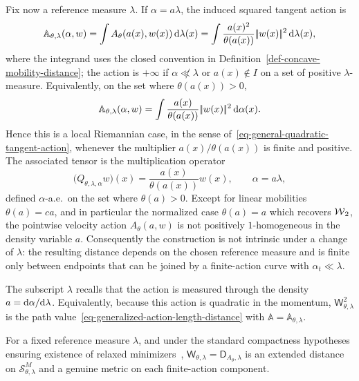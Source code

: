 Fix now a reference measure \(\lambda\). If \(\alpha=a\lambda\), the induced squared tangent action is
\[
	\mathbb A_{\theta,\lambda}(\alpha,w)
	=
	\int A_\theta(a(x),w(x))\,\mathrm{d}\lambda(x)
	=
	\int \frac{a(x)^2}{\theta(a(x))}|\!| w(x) |\!|^2\,\mathrm{d}\lambda(x),
\]
where the integrand uses the closed convention in Definition~\ref{def-concave-mobility-distance}; the action is $+\infty$ if $\alpha\not\ll\lambda$ or $a(x)\notin I$ on a set of positive $\lambda$-measure. Equivalently, on the set where \(\theta(a(x))>0\),
\[
	\mathbb A_{\theta,\lambda}(\alpha,w)
	=
	\int \frac{a(x)}{\theta(a(x))}|\!| w(x) |\!|^2\,\mathrm{d}\alpha(x).
\]
Hence this is a local Riemannian case, in the sense of~\eqref{eq-general-quadratic-tangent-action}, whenever the multiplier \(a(x)/\theta(a(x))\) is finite and positive. The associated tensor is the multiplication operator
\begin{equation}\label{eq-concave-mobility-q-alpha}
	\big(Q_{\theta,\lambda,\alpha}w\big)(x)
	=
	\frac{a(x)}{\theta(a(x))}w(x),
	\qquad
	\alpha=a\lambda,
\end{equation}
defined \(\alpha\)-a.e.\ on the set where \(\theta(a)>0\). Except for linear mobilities \(\theta(a)=ca\), and in particular the normalized case \(\theta(a)=a\) which recovers \(\operatorname{\mathcal{W}}_2\), the pointwise velocity action \(A_\theta(a,w)\) is not positively \(1\)-homogeneous in the density variable \(a\). Consequently the construction is not intrinsic under a change of \(\lambda\): the resulting distance depends on the chosen reference measure and is finite only between endpoints that can be joined by a finite-action curve with \(\alpha_t\ll\lambda\).

The subscript \(\lambda\) recalls that the action is measured through the density \(a=\mathrm{d}\alpha/\mathrm{d}\lambda\).
	Equivalently, because this action is quadratic in the momentum, \(\mathsf W_{\theta,\lambda}^2\) is the path value~\eqref{eq-generalized-action-length-distance} with \(\mathbb A=\mathbb A_{\theta,\lambda}\).

\begin{prop}\label{prop-concave-mobility-distance}
	For a fixed reference measure \(\lambda\), and under the standard compactness hypotheses ensuring existence of relaxed minimizers~\cite{dolbeault2009new}, \(\mathsf W_{\theta,\lambda}=\mathsf D_{A_\theta,\lambda}\) is an extended distance on $\mathcal S_{\theta,\lambda}^M$ and a genuine metric on each finite-action component.
\end{prop}

